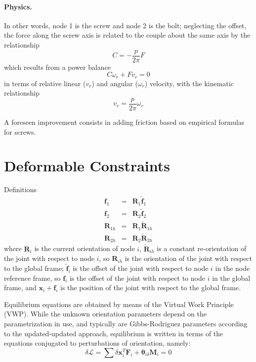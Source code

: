 \documentclass[10pt,dvips,fleqn,subeqn]{report}
\newcommand{\T}[1]{\boldsymbol{#1}}
\begin{document}
\paragraph{Physics.}
In other words, node 1 is the screw and node 2 is the bolt;
neglecting the offset, the force along the screw axis is related
to the couple about the same axis by the relationship
\begin{equation}
	C = - \frac{p}{2\pi} F
\end{equation}
which results from a power balance
\begin{equation}
	C \omega_r + F v_r = 0
\end{equation}
in terms of relative linear ($v_r$) and angular ($\omega_r$) velocity,
with the kinematic relationship
\begin{equation} 
	v_r = \frac{p}{2\pi} \omega_r
\end{equation}

A foreseen improvement consists in adding friction based on empirical
formulas for screws.







\section{Deformable Constraints}
Definitions
\begin{eqnarray*}
	\T{f}_1 & = & \T{R}_1 \tilde{\T{f}}_1 \\
	\T{f}_2 & = & \T{R}_2 \tilde{\T{f}}_2 \\
	\T{R}_{1h} & = & \T{R}_1 \tilde{\T{R}}_{1h} \\
	\T{R}_{2h} & = & \T{R}_2 \tilde{\T{R}}_{2h}
\end{eqnarray*}
where $\T{R}_i$ is the current orientation of node $i$, 
$\tilde{\T{R}}_{ih}$ is a constant re-orientation of the joint
with respect to node $i$, so $\T{R}_{ih}$ is the orientation
of the joint with respect to the global frame;
$\tilde{\T{f}}_i$ is the offset of the joint with respect to
node $i$ in the node reference frame, so $\T{f}_i$ is the offset 
of the joint with respect to node $i$ in the global frame, and
$\T{x}_i+\T{f}_i$ is the position of the joint with respect 
to the global frame.

Equilibrium equations are obtained by means of the Virtual Work
Principle (VWP).
While the unknown orientation parameters depend on the parametrization 
in use, and typically are Gibbs-Rodriguez parameters according 
to the updated-updated approach, equilibrium is written in terms
of the equations conjugated to perturbations of orientation,
namely:
\begin{equation}
	\delta\mathcal{L} = \sum \delta\T{x}_i^T \T{F}_i
	+ \T{\theta}_{i\delta} \T{M}_i = 0
\end{equation}
\end{document}
